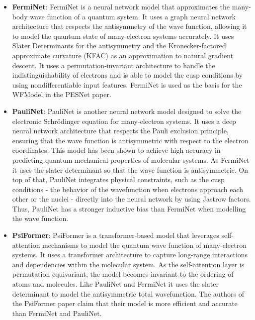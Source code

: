 \documentclass{article}
\begin{document}
\begin{itemize}
    \item \textbf{FermiNet}: FermiNet is a neural network model that approximates the many-body wave function of a quantum system. It uses a graph neural network architecture that respects the antisymmetry of the wave function, allowing it to model the quantum state of many-electron systems accurately. It uses Slater Determinants for the antisymmetry and the Kronecker-factored approximate curvature (KFAC) as an approximation to natural gradient descent. It uses a permutation-invariant architecture to handle the indistinguishability of electrons and is able to model the cusp conditions by using nondifferentiable input features. FermiNet is used as the basis for the WFModel in the PESNet paper.
    \item \textbf{PauliNet}: PauliNet is another neural network model designed to solve the electronic Schrödinger equation for many-electron systems. It uses a deep neural network architecture that respects the Pauli exclusion principle, ensuring that the wave function is antisymmetric with respect to the electron coordinates. This model has been shown to achieve high accuracy in predicting quantum mechanical properties of molecular systems. As FermiNet it uses the slater determinant so that the wave function is antisymmetric. On top of that, PauliNet integrates physical constraints, such as the cusp conditions - the behavior of the wavefunction when electrons approach each other or the nuclei - directly into the neural network by using Jastrow factors. Thus, PauliNet has a stronger inductive bias than FermiNet when modelling the wave function.
    \item \textbf{PsiFormer}: PsiFormer is a transformer-based model that leverages self-attention mechanisms to model the quantum wave function of many-electron systems. It uses a transformer architecture to capture long-range interactions and dependencies within the molecular system. As the self-attention layer is permutation equivariant, the model becomes invariant to the ordering of atoms and molecules. Like PauliNet and FermiNet it uses the slater determinant to model the antisymmetric total wavefunction. The authors of the PsiFormer paper claim that their model is more efficient and accurate than FermiNet and PauliNet.
\end{itemize}
\end{document}

